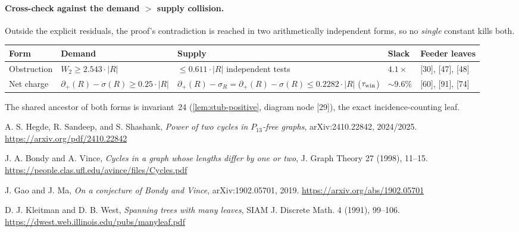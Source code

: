 \documentclass[11pt]{article}
\newcommand{\defp}{\partial_+}
\begin{document}
\paragraph{Cross-check against the demand $>$ supply collision.}
Outside the explicit residuals, the proof's contradiction is reached in two
arithmetically independent forms, so no \emph{single} constant kills both.

\begin{center}\small
\begin{tabular}{L{0.12\textwidth} L{0.23\textwidth} L{0.27\textwidth} L{0.07\textwidth} L{0.15\textwidth}}
\toprule
\textbf{Form} & \textbf{Demand} & \textbf{Supply} & \textbf{Slack} & \textbf{Feeder leaves} \\
\midrule
Obstruction & $W_2\ge2.543\cdot|R|$ & $\le0.611\cdot|R|$ independent tests & $4.1\times$ & {[30]}, {[47]}, {[48]} \\
Net charge & $\defp(R)-\sigma(R)\ge0.25\cdot|R|$ & $\defp(R)-\sigma_R=\defp(R)-\sigma(R)\le0.2282\cdot|R|$ ($\tau_{\rm win}$) & $\sim9.6\%$ & {[60]}, {[91]}, {[74]} \\
\bottomrule
\end{tabular}
\end{center}
\noindent The shared ancestor of both forms is invariant~24 (\cref{lem:stub-positive}, diagram node {[29]}), the exact incidence-counting leaf.

\begin{thebibliography}{9}

A. S. Hegde, R. Sandeep, and S. Shashank,
\emph{Power of two cycles in $P_{13}$-free graphs},
arXiv:2410.22842, 2024/2025.
\url{https://arxiv.org/pdf/2410.22842}

J. A. Bondy and A. Vince,
\emph{Cycles in a graph whose lengths differ by one or two},
J. Graph Theory 27 (1998), 11--15.
\url{https://people.clas.ufl.edu/avince/files/Cycles.pdf}

J. Gao and J. Ma,
\emph{On a conjecture of Bondy and Vince},
arXiv:1902.05701, 2019.
\url{https://arxiv.org/abs/1902.05701}

D. J. Kleitman and D. B. West,
\emph{Spanning trees with many leaves},
SIAM J. Discrete Math. 4 (1991), 99--106.
\url{https://dwest.web.illinois.edu/pubs/manyleaf.pdf}

\end{thebibliography}
\end{document}
